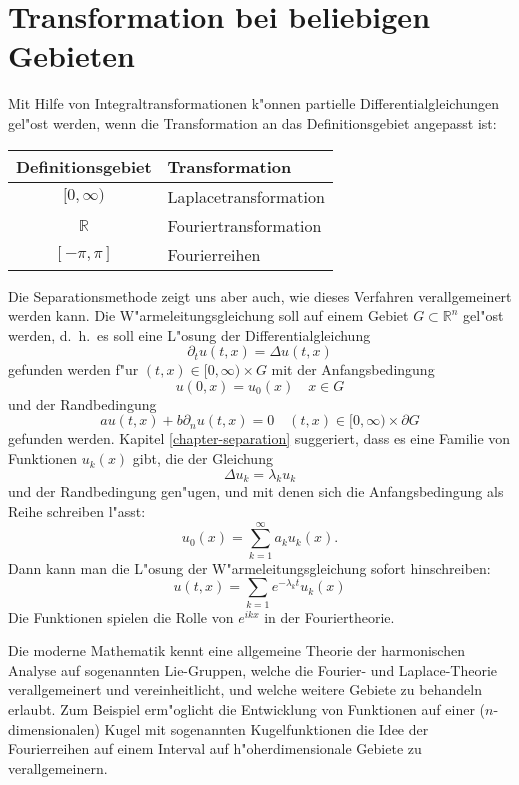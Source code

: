 \section{Transformation bei beliebigen Gebieten}
Mit Hilfe von Integraltransformationen k"onnen partielle
Differentialgleichungen  gel"ost werden, wenn die Transformation
an das Definitionsgebiet angepasst ist:
\begin{center}
\begin{tabular}{cl}
Definitionsgebiet&Transformation\\
\hline
$[0,\infty)$&Laplacetransformation\\
$\mathbb R$&Fouriertransformation\\
$[-\pi,\pi]$&Fourierreihen
\end{tabular}
\end{center}
Die Separationsmethode zeigt uns aber auch, wie dieses 
Verfahren verallgemeinert werden kann. Die W"armeleitungsgleichung
soll auf einem Gebiet $G\subset \mathbb R^n$ gel"ost werden, d.~h.~es
soll eine L"osung der Differentialgleichung
$$\partial_t u(t,x)=\Delta u(t,x)$$
gefunden werden f"ur $(t,x)\in [0,\infty)\times G$ mit der Anfangsbedingung
$$u(0,x)=u_0(x) \quad x\in G$$
und der Randbedingung
$$au(t,x)+b\partial_nu(t,x)=0\quad (t,x)\in[0,\infty)\times \partial G$$
gefunden werden. Kapitel \ref{chapter-separation} suggeriert, dass
es eine Familie von Funktionen $u_k(x)$ gibt, die der Gleichung
$$\Delta u_k=\lambda_k u_k$$
und der Randbedingung gen"ugen, und mit denen sich die 
Anfangsbedingung als Reihe schreiben l"asst:
$$u_0(x)=\sum_{k=1}^\infty a_ku_k(x).$$
Dann kann man die L"osung der W"armeleitungsgleichung sofort
hinschreiben:
$$u(t,x)=\sum_{k=1}e^{-\lambda_kt}u_k(x)$$
Die Funktionen spielen die Rolle von $e^{ikx}$ in der Fouriertheorie.

Die moderne Mathematik kennt eine allgemeine Theorie der harmonischen
Analyse auf sogenannten Lie-Gruppen, welche die Fourier- und 
Laplace-Theorie verallgemeinert und vereinheitlicht, und welche
weitere Gebiete zu behandeln erlaubt. Zum Beispiel erm"oglicht
die Entwicklung von Funktionen auf einer ($n$-dimensionalen)
Kugel mit sogenannten Kugelfunktionen die Idee der Fourierreihen
auf einem Interval auf h"oherdimensionale Gebiete zu verallgemeinern.

